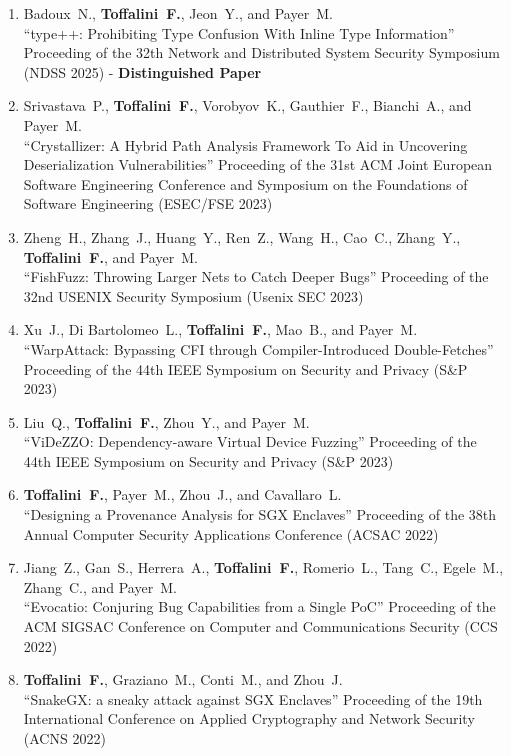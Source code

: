 \begin{enumerate}[leftmargin=5mm]
\item[C12] Badoux~N., \textbf{Toffalini~F.}, Jeon~Y., and Payer~M.\\``type++: Prohibiting Type Confusion With Inline Type Information'' Proceeding of the 32th Network and Distributed System Security Symposium (NDSS 2025)  - \textbf{Distinguished Paper}
\item[C11] Srivastava~P., \textbf{Toffalini~F.}, Vorobyov~K., Gauthier~F., Bianchi~A., and Payer~M.\\``Crystallizer: A Hybrid Path Analysis Framework To Aid in Uncovering Deserialization Vulnerabilities'' Proceeding of the 31st ACM Joint European Software Engineering Conference and Symposium on the Foundations of Software Engineering (ESEC/FSE 2023) 
\item[C10] Zheng~H., Zhang~J., Huang~Y., Ren~Z., Wang~H., Cao~C., Zhang~Y., \textbf{Toffalini~F.}, and Payer~M.\\``FishFuzz: Throwing Larger Nets to Catch Deeper Bugs'' Proceeding of the 32nd USENIX Security Symposium (Usenix SEC 2023) 
\item[C9] Xu~J., Di Bartolomeo~L., \textbf{Toffalini~F.}, Mao~B., and Payer~M.\\``WarpAttack: Bypassing CFI through Compiler-Introduced Double-Fetches'' Proceeding of the 44th IEEE Symposium on Security and Privacy (S\&P 2023) 
\item[C8] Liu~Q., \textbf{Toffalini~F.}, Zhou~Y., and Payer~M.\\``ViDeZZO: Dependency-aware Virtual Device Fuzzing'' Proceeding of the 44th IEEE Symposium on Security and Privacy (S\&P 2023) 
\item[C7] \textbf{Toffalini~F.}, Payer~M., Zhou~J., and Cavallaro~L.\\``Designing a Provenance Analysis for SGX Enclaves'' Proceeding of the 38th Annual Computer Security Applications Conference (ACSAC 2022) 
\item[C6] Jiang~Z., Gan~S., Herrera~A., \textbf{Toffalini~F.}, Romerio~L., Tang~C., Egele~M., Zhang~C., and Payer~M.\\``Evocatio: Conjuring Bug Capabilities from a Single PoC'' Proceeding of the ACM SIGSAC Conference on Computer and Communications Security (CCS 2022) 
\item[C5] \textbf{Toffalini~F.}, Graziano~M., Conti~M., and Zhou~J.\\``SnakeGX: a sneaky attack against SGX Enclaves'' Proceeding of the 19th International Conference on Applied Cryptography and Network Security (ACNS 2022) 

\end{enumerate}
